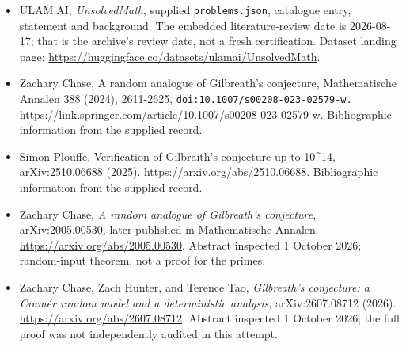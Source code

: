 \documentclass[11pt,a4paper]{article}
\begin{document}
{\small

\begin{itemize}

\item[\hypertarget{source:statement:1}{S1}] ULAM.AI, \emph{UnsolvedMath}, supplied \texttt{problems.json}, catalogue entry, statement and background. The embedded literature-review date is 2026-08-17; that is the archive’s review date, not a fresh certification. Dataset landing page: \url{https://huggingface.co/datasets/ulamai/UnsolvedMath}.

\item[\hypertarget{source:statement:2}{S2}] Zachary Chase, A random analogue of Gilbreath's conjecture, Mathematische Annalen 388 (2024), 2611-2625, \nolinkurl{doi:10.1007/s00208-023-02579-w.} \url{https://link.springer.com/article/10.1007/s00208-023-02579-w}. Bibliographic information from the supplied record.

\item[\hypertarget{source:statement:3}{S3}] Simon Plouffe, Verification of Gilbraith's conjecture up to 10\textasciicircum{}14, arXiv:2510.06688 (2025). \url{https://arxiv.org/abs/2510.06688}. Bibliographic information from the supplied record.


\item[E1] Zachary Chase, \emph{A random analogue of Gilbreath's
conjecture}, arXiv:2005.00530, later published in Mathematische Annalen.
\url{https://arxiv.org/abs/2005.00530}. Abstract inspected 1 October 2026;
random-input theorem, not a proof for the primes.
\item[E2] Zachary Chase, Zach Hunter, and Terence Tao,
\emph{Gilbreath's conjecture: a Cram\'er random model and a deterministic
analysis}, arXiv:2607.08712 (2026).
\url{https://arxiv.org/abs/2607.08712}. Abstract inspected 1 October 2026;
the full proof was not independently audited in this attempt.

\end{itemize}

}

\label{end:statement}
\end{document}
